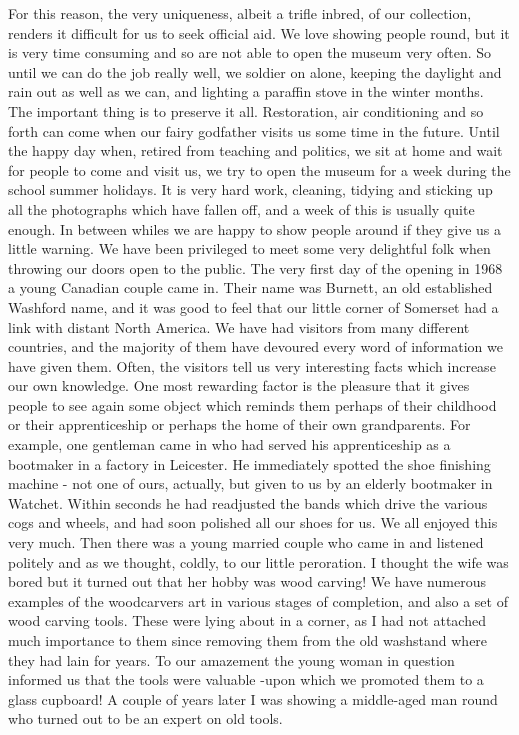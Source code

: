 For this reason, the very uniqueness, albeit a trifle inbred, of our collection, renders it difficult for us to seek official aid. We love showing people round, but it is very time consuming and so are not able to open the museum very often. So until we can do the job really well, we soldier on alone, keeping the daylight and rain out as well as we can, and lighting a paraffin stove in the winter months. The important thing is to preserve it all. Restoration, air conditioning and so forth can come when our fairy godfather visits us some time in the future. Until the happy day when, retired from teaching and politics, we sit at home and wait for people to come and visit us, we try to open the museum for a week during the school summer holidays. It is very hard work, cleaning, tidying and sticking up all the photographs which have fallen off, and a week of this is usually quite enough. In between whiles we are happy to show people around if they give us a little warning. We have been privileged to meet some very delightful folk when throwing our doors open to the public. The very first day of the opening in 1968 a young Canadian couple came in. Their name was Burnett, an old established Washford name, and it was good to feel that our little corner of Somerset had a link with distant North America. We have had visitors from many different countries, and the majority of them have devoured every word of information we have given them. Often, the visitors tell us very interesting facts which increase our own knowledge. One most rewarding factor is the pleasure that it gives people to see again some object which reminds them perhaps of their childhood or their apprenticeship or perhaps the home of their own grandparents. For example, one gentleman came in who had served his apprenticeship as a bootmaker in a factory in Leicester. He immediately spotted the shoe finishing machine - not one of ours, actually, but given to us by an elderly bootmaker in Watchet. Within seconds he had readjusted the bands which drive the various cogs and wheels, and had soon polished all our shoes for us. We all enjoyed this very much. Then there was a young married couple who came in and listened politely and as we thought, coldly, to our little peroration. I thought the wife was bored but it turned out that her hobby was wood carving! We have numerous examples of the woodcarvers art in various stages of completion, and also a set of wood carving tools. These were lying about in a corner, as I had not attached much importance to them since removing them from the old washstand where they had lain for years. To our amazement the young woman in question informed us that the tools were valuable -upon which we promoted them to a glass cupboard! A couple of years later I was showing a middle-aged man round who turned out to be an expert on old tools.

